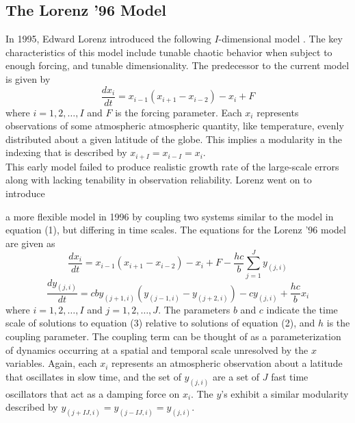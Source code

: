 \documentclass[onecolumn]{article}
\begin{document}
\begin{multicols}{2}

\subsection{The Lorenz '96 Model}
\indent In 1995, Edward Lorenz introduced the following $I$-dimensional model \cite{lorenz95,lorenz98}.
The key characteristics of this model include tunable chaotic behavior when subject to enough forcing, and tunable dimensionality.
The predecessor to the current model is given by
\begin{equation}
\frac{dx_{i}}{dt}=x_{i-1}(x_{i+1}-x_{i-2})-x_{i}+F
\end{equation}
where $i=1,2,\dots,I$ and $F$ is the forcing parameter.
Each $x_{i}$ represents observations of some atmospheric atmospheric quantity, like temperature, evenly distributed about a given latitude of the globe.
This implies a modularity in the indexing that is described by $x_{i+I}=x_{i-I}=x_{i}$. \\
\indent This early model failed to produce realistic growth rate of the large-scale errors along with lacking tenability in observation reliability.
Lorenz went on to introduce 

a more flexible model in 1996 by coupling two systems similar to the model in equation (1), but differing in time scales. The equations for the Lorenz '96 model \cite{lorenz96} are given as
 \begin{equation}
 	\frac{dx_{i}}{dt}=x_{i-1}(x_{i+1}-x_{i-2})-x_{i}+F-\frac{hc}{b}\displaystyle\sum_{j=1}^{J}y_{(j,i)}
 \end{equation}\vspace{-1cm}
 \begin{equation}
 	\frac{dy_{(j,i)}}{dt}=cby_{(j+1,i)}(y_{(j-1,i)}-y_{(j+2,i)})-cy_{(j,i)}+\frac{hc}{b}x_{i}
 \end{equation}
 where $i=1,2,\dots,I$ and $j=1,2,\dots,J$. The parameters $b$ and $c$ indicate the time scale of solutions to equation (3) relative to solutions of equation (2), and $h$ is the coupling parameter. The coupling term can be thought of as a parameterization of dynamics occurring at a  spatial and temporal scale unresolved by the $x$ variables. Again, each $x_{i}$ represents an atmospheric observation about a latitude that oscillates in slow time, and the set of $y_{(j,i)}$ are a set of $J$ fast time oscillators that act as a damping force on $x_{i}$. The $y$'s exhibit a similar modularity described by $y_{(j+IJ,i)}=y_{(j-IJ,i)}=y_{(j,i)}$.
 

\end{multicols}
\end{document}
